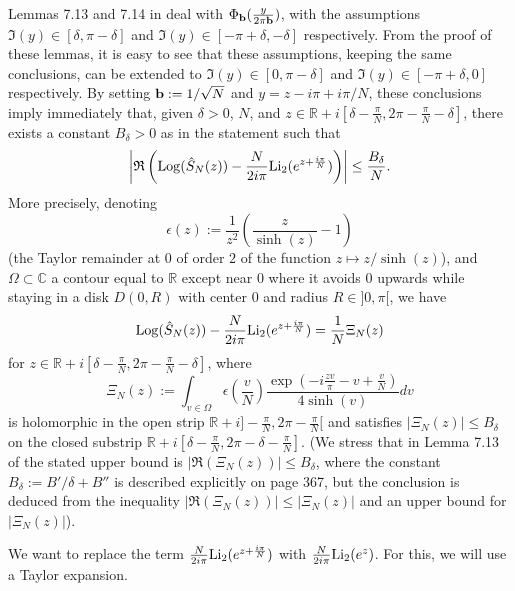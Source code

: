 \documentclass[11pt]{amsart}
\newcommand{\mr}{\mathbb{R}}
\newcommand{\R}{\mathbb{R}}
\newcommand{\C}{\mathbb{C}}
\newcommand{\Log}{{\rm Log}}
\newcommand{\rmb}{{\rm \bf b}}
\begin{document}
{Lemmas 7.13 and 7.14 in \cite{BGP-N} deal with $\textstyle \Phi_{\rmb}(\frac{y}{2\pi \rmb})$, with the assumptions $\mathfrak{I}(y)\in [\delta,\pi-\delta]$ and $\mathfrak{I}(y)\in [-\pi+\delta,-\delta]$ respectively. From the proof of these lemmas, it is easy to see that these assumptions, keeping the same conclusions, can be extended to $\mathfrak{I}(y)\in [0,\pi-\delta]$ and $\mathfrak{I}(y)\in [-\pi+\delta,0]$ respectively. By setting $\rmb:= 1/\sqrt{N}$ and $y=z-i\pi+i\pi/N$, these conclusions imply immediately that, given $\delta>0$, $N$, and $\textstyle z\in \mr + i[\delta-\frac{\pi}{N}, 2\pi-\frac{\pi}{N}-\delta]$, there exists a constant $B_\delta>0$ as in the statement such that
 $$\left\vert \mathfrak{R}\left(\Log(\hat{S}_N(z)) -\frac{N}{2i\pi}{\rm Li_2}(e^{z+\frac{i\pi}{N}})\right) \right\vert \leq \frac{B_\delta}{N}.$$
 More precisely, denoting 
$$\epsilon(z):= \dfrac{1}{z^2}\left (\dfrac{z}{\sinh(z)}-1\right )$$ (the Taylor remainder at $0$ of order $2$ of the function $z \mapsto z/\sinh(z)$), and $\Omega\subset \C$ a contour equal to $\R$ except near $0$ where it avoids $0$ upwards while staying in a disk $D(0,R)$ with center $0$ and radius $R\in ]0,\pi[$, we have
\begin{equation}\label{eq:BAGPN:Xi}
\Log(\hat{S}_N(z)) -\frac{N}{2i\pi}{\rm Li_2}(e^{z+\frac{i\pi}{N}})
= \dfrac{1}{N} \Xi_N(z)
\end{equation}
for $\textstyle z\in \mr + i[\delta-\frac{\pi}{N}, 2\pi-\frac{\pi}{N}-\delta]$, where 
\begin{equation}\label{defXiNjanv26}
\Xi_N(z) :=
 \int_{v\in \Omega} \epsilon\left (\frac{v}{N}\right ) 
\dfrac{\exp(-i\frac{z v}{\pi}-v+\frac{v}{N})}{4 \sinh(v)}dv
\end{equation}
is holomorphic in the open strip $\mr +i]\textstyle -\frac{\pi}{N}, 2\pi-\frac{\pi}{N}[$ and satisfies $\vert \Xi_N(z)\vert \leq B_\delta$ on the closed substrip $\mr +i[\textstyle \delta-\frac{\pi}{N}, 2\pi-\delta-\frac{\pi}{N}]$. (We stress that in Lemma 7.13 of  \cite{BGP-N} the stated upper bound is $\vert \mathfrak{R}(\Xi_N(z))\vert \leq B_\delta$, where the constant $B_\delta:= B'/\delta+B''$ is described explicitly on page 367, but the conclusion is deduced from the inequality $\vert \mathfrak{R}(\Xi_N(z))\vert \leq\vert \Xi_N(z)\vert$ and an upper bound for $\vert \Xi_N(z)\vert$).

We want to replace the term $\textstyle \frac{N}{2i\pi}{\rm Li_2}(e^{z+\frac{i\pi}{N}})$ with $\textstyle \frac{N}{2i\pi}{\rm Li_2}(e^{z})$. For this, we will use a Taylor expansion.

}
\end{document}
